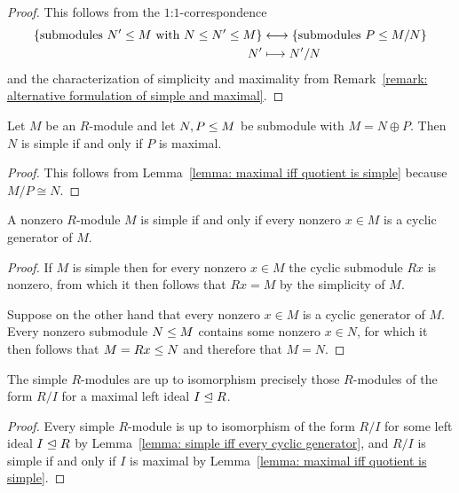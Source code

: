 \begin{proof}
  This follows from the $1$:$1$-correspondence
  \begin{align*}
    \{ \text{submodules $N' \leq M$ with $N \leq N' \leq M$} \}
    &\longleftrightarrow
    \{ \text{submodules $P \leq M/N$} \}
    \\
                  N'
    &\longmapsto  N'/N
  \end{align*}
  and the characterization of simplicity and maximality from Remark~\ref{remark: alternative formulation of simple and maximal}.
\end{proof}


\begin{corollary}
  Let $M$ be an $R$-module and let $N, P \leq M$ be submodule with $M = N \oplus P$.
  Then $N$ is simple if and only if $P$ is maximal.
\end{corollary}


\begin{proof}
  This follows from Lemma~\ref{lemma: maximal iff quotient is simple} because $M/P \cong N$.
\end{proof}


\begin{lemma}
  \label{lemma: simple iff every cyclic generator}
  A nonzero $R$-module $M$ is simple if and only if every nonzero $x \in M$ is a cyclic generator of $M$. 
\end{lemma}


\begin{proof}
  If $M$ is simple then for every nonzero $x \in M$ the cyclic submodule $Rx$ is nonzero, from which it then follows that $Rx = M$ by the simplicity of $M$.
  
  Suppose on the other hand that every nonzero $x \in M$ is a cyclic generator of $M$.
  Every nonzero submodule $N \leq M$ contains some nonzero $x \in N$, for which it then follows that $M = Rx \leq N$ and therefore that $M = N$.
\end{proof}


\begin{corollary}
  \label{corollary: simple modules are quotients by maximal ideals}
  The simple $R$-modules are up to isomorphism precisely those $R$-modules of the form $R/I$ for a maximal left ideal $I \trianglelefteq R$.
\end{corollary}


\begin{proof}
  Every simple $R$-module is up to isomorphism of the form $R/I$ for some left ideal $I \trianglelefteq R$ by Lemma~\ref{lemma: simple iff every cyclic generator}, and $R/I$ is simple if and only if $I$ is maximal by Lemma~\ref{lemma: maximal iff quotient is simple}.
\end{proof}


